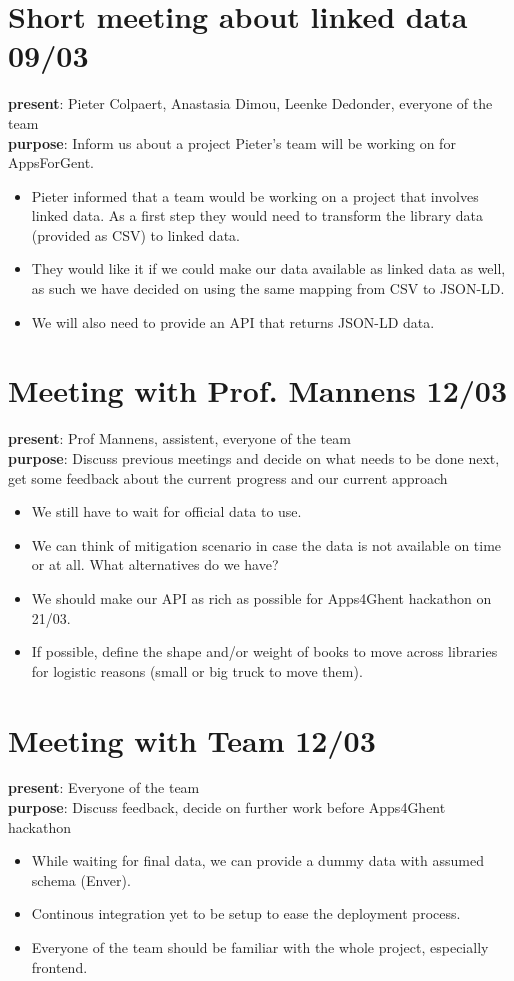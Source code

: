 \section{Short meeting about linked data 09/03}
{\bf present}: Pieter Colpaert, Anastasia Dimou, Leenke Dedonder, everyone of the team\\
{\bf purpose}: Inform us about a project Pieter's team will be working on for AppsForGent.
\begin{itemize}
  \item Pieter informed that a team would be working on a project that involves linked data. As a first step they would need to transform the library data (provided as CSV) to linked data.
  \item They would like it if we could make our data available as linked data as well, as such we have decided on using the same mapping from CSV to JSON-LD.
  \item We will also need to provide an API that returns JSON-LD data.
\end{itemize}

\section{Meeting with Prof. Mannens 12/03}
{\bf present}: Prof Mannens, assistent, everyone of the team\\
{\bf purpose}: Discuss previous meetings and decide on what needs to be done next, get some feedback about the current progress and our current approach\\
\begin{itemize}
	\item We still have to wait for official data to use.
	\item We can think of mitigation scenario in case the data is not available on time or at all. What alternatives do we have?
	\item We should make our API as rich as possible for Apps4Ghent hackathon on 21/03.
	\item If possible, define the shape and/or weight of books to move across libraries for logistic reasons (small or big truck to move them).
\end{itemize}

\section{Meeting with Team 12/03}
{\bf present}: Everyone of the team\\
{\bf purpose}: Discuss feedback, decide on further work before Apps4Ghent hackathon\\
\begin{itemize}
	\item While waiting for final data, we can provide a dummy data with assumed schema (Enver). 
	\item Continous integration yet to be setup to ease the deployment process.
	\item Everyone of the team should be familiar with the whole project, especially frontend.
\end{itemize}

